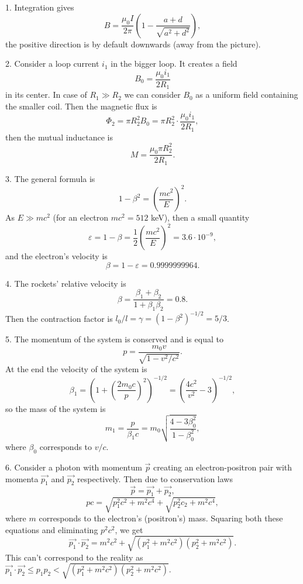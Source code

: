 \documentclass[14pt,a4paper,pdflatex]{disser}
\begin{document}
1. Integration gives
$$
  B=\frac{\mu_0 I}{2\pi}\left(1-\frac{a+d}{\sqrt{a^2+d^2}}\right),
$$
the positive direction is by default downwards (away from the picture).

2. Consider a loop current $i_1$ in the bigger loop. It creates a field
$$
  B_0=\frac{\mu_0 i_1}{2R_1}
$$
in its center. In case of $R_1\gg R_2$ we can consider $B_0$ as a uniform field containing the smaller coil. Then the magnetic flux is
$$
  \Phi_2=\pi R_2^2 B_0=\pi R_2^2 \cdot \frac{\mu_0 i_1}{2R_1},
$$
then the mutual inductance is
$$
  M=\frac{\mu_0 \pi R_2^2}{2R_1}.
$$

3. The general formula is
$$
  1-\beta^2=\left(\frac{mc^2}{E}\right)^2.
$$
As $E\gg mc^2$ (for an electron $mc^2=512$ keV), then a small quantity
$$
  \varepsilon=1-\beta=\frac{1}{2}\left(\frac{mc^2}{E}\right)^2=3.6\cdot 10^{-9},
$$
and the electron's velocity is
$$
  \beta=1-\varepsilon=0.9999999964.
$$

4. The rockets' relative velocity is
$$
  \beta=\frac{\beta_1+\beta_2}{1+\beta_1 \beta_2}=0.8.
$$
Then the contraction factor is $l_0/l=\gamma=\left(1-\beta^2\right)^{-1/2}=5/3$.

5. The momentum of the system is conserved and is equal to
$$
  p=\frac{m_0 v}{\sqrt{1-v^2/c^2}}.
$$
At the end the velocity of the system is
$$
  \beta_1=\left(1+\left(\frac{2m_0 c}{p}\right)^2\right)^{-1/2}=\left(\frac{4c^2}{v^2}-3\right)^{-1/2},
$$
so the mass of the system is
$$
  m_1=\frac{p}{\beta_1 c}=m_0\sqrt{\frac{4-3\beta_0^2}{1-\beta_0^2}},
$$
where $\beta_0$ corresponds to $v/c$.

6. Consider a photon with momentum $\overrightarrow{p}$ creating an electron-positron pair with momenta $\overrightarrow{p_1}$ and $\overrightarrow{p_2}$ respectively. Then due to conservation laws
$$
  \overrightarrow{p}=\overrightarrow{p_1}+\overrightarrow{p_2},
$$
$$
  pc=\sqrt{p_1^2 c^2+m^2 c^4}+\sqrt{p_2^2 c_2+m^2 c^4},
$$
where $m$ corresponds to the electron's (positron's) mass. Squaring both these equations and eliminating $p^2 c^2$, we get
$$
  \overrightarrow{p_1}\cdot \overrightarrow{p_2}=m^2 c^2+\sqrt{\left(p_1^2+m^2 c^2\right)\left(p_2^2+m^2 c^2\right)}.
$$
This can't correspond to the reality as $\overrightarrow{p_1}\cdot \overrightarrow{p_2}\le p_1 p_2<\sqrt{\left(p_1^2+m^2 c^2\right)\left(p_2^2+m^2 c^2\right)}.$
\end{document}
